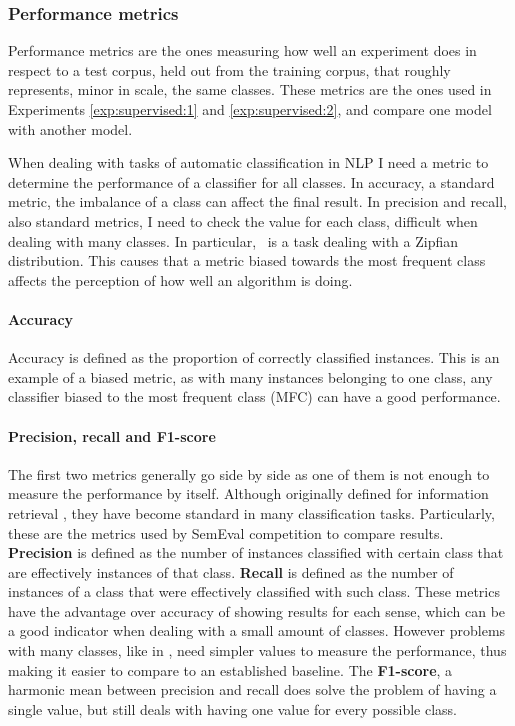 \subsubsection{Performance metrics}\label{sec:supervised:performance:metrics}

Performance metrics are the ones measuring how well an experiment does in
respect to a test corpus, held out from the training corpus, that roughly
represents, minor in scale, the same classes. These metrics are the ones used
in Experiments \ref{exp:supervised:1} and \ref{exp:supervised:2}, and compare
one model with another model.

When dealing with tasks of automatic classification in NLP I need a metric to
determine the performance of a classifier for all classes. In accuracy, a
standard metric, the imbalance of a class can affect the final result. In
precision and recall, also standard metrics, I need to check the value for
each class, difficult when dealing with many classes. In particular, \wsd~is a
task dealing with a Zipfian \cite{j:zpf} distribution. This causes that a
metric biased towards the most frequent class affects the perception of how
well an algorithm is doing.

\paragraph{Accuracy} Accuracy is defined as the proportion of correctly
classified instances. This is an example of a biased metric, as with many
instances belonging to one class, any classifier biased to the most frequent
class (MFC) can have a good performance.

\paragraph{Precision, recall and F1-score} The first two metrics generally go
side by side as one of them is not enough to measure the performance by itself.
Although originally defined for information retrieval
\cite{Rijsbergen:1979:IR:539927}, they have become standard in many
classification tasks. Particularly, these are the metrics used by SemEval
competition to compare results. {\bf Precision} is defined as the number of
instances classified with certain class that are effectively instances of that
class. {\bf Recall} is defined as the number of instances of a class that were
effectively classified with such class. These metrics have the advantage over
accuracy of showing results for each sense, which can be a good indicator when
dealing with a small amount of classes. However problems with many classes,
like in \vsd, need simpler values to measure the performance, thus making it
easier to compare to an established baseline. The {\bf F1-score}, a harmonic
mean between precision and recall does solve the problem of having a single
value, but still deals with having one value for every possible class.

